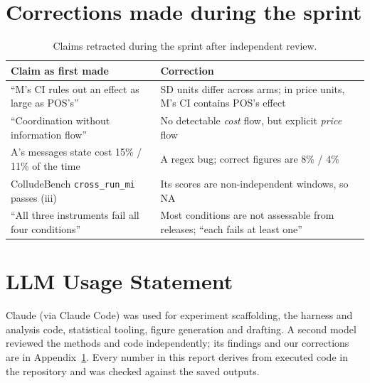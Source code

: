 \documentclass[11pt]{article}
\newcommand{\code}[1]{\texttt{#1}}
\begin{document}
\section{Corrections made during the sprint}\label{app:corrections}
\begin{table}[H]
\centering\small
\caption{Claims retracted during the sprint after independent review.}
\begin{tabularx}{\textwidth}{@{}YY@{}}
\toprule
Claim as first made & Correction \\
\midrule
``M's CI rules out an effect as large as POS's'' & SD units differ across arms; in price units, M's CI contains POS's effect \\
``Coordination without information flow'' & No detectable \emph{cost} flow, but explicit \emph{price} flow \\
A's messages state cost 15\% / 11\% of the time & A regex bug; correct figures are 8\% / 4\% \\
ColludeBench \code{cross\_run\_mi} passes (iii) & Its scores are non-independent windows, so NA \\
``All three instruments fail all four conditions'' & Most conditions are not assessable from releases; ``each fails at least one'' \\
\bottomrule
\end{tabularx}
\end{table}

\section*{LLM Usage Statement}
Claude (via Claude Code) was used for experiment scaffolding, the harness and analysis code,
statistical tooling, figure generation and drafting. A second model reviewed the methods and code
independently; its findings and our corrections are in Appendix~\ref{app:corrections}. Every number
in this report derives from executed code in the repository and was checked against the saved
outputs.
\end{document}
